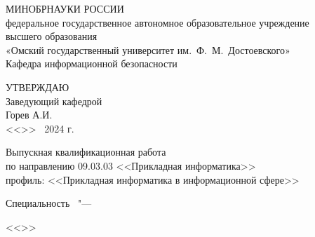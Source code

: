 \thispagestyle{empty}
\begin{center}
    МИНОБРНАУКИ РОССИИ\\
    федеральное государственное автономное образовательное учреждение\\
    высшего образования\\
    «Омский государственный университет им.~Ф.~М.~Достоевского»\\
    Кафедра информационной безопасности
\end{center}
%
\vspace{0pt plus4fill} %
\begin{flushright}
    УТВЕРЖДАЮ\\
    Заведующий кафедрой\\
    Горев А.И.\\
    <<\underline{\hspace{0.3in}}>> \underline{\hspace{1in}}~2024 г.

\end{flushright}
%
%
\vspace{0pt plus1fill} %
\begin{center}
     \textbf{ %
    \thesisTitle}

    \vspace{0pt plus2fill} %
    {%
        Выпускная квалификационная работа\\
        по направлению 09.03.03 <<Прикладная информатика>>\\
        профиль: <<Прикладная информатика в информационной сфере>>
    }

    \ifdefined\thesisSpecialtyTwoNumber
    {%
        Специальность \thesisSpecialtyTwoNumber\ "---

        <<\thesisSpecialtyTwoTitle>>
    }
    \fi

    \vspace{0pt plus2fill} %

\end{center}

